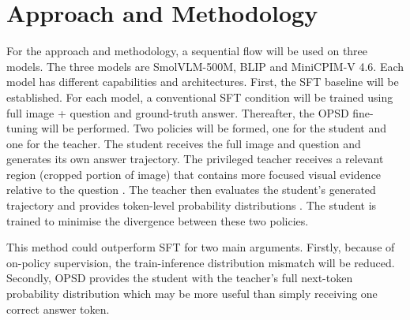 \section{Approach and Methodology}

For the approach and methodology, a sequential flow will be used on three models. The three models are 
SmolVLM-500M, BLIP and MiniCPIM-V 4.6. Each model has different capabilities and architectures.
First, the SFT baseline will be established. For each model, a conventional SFT condition will be trained
using full image + question and ground-truth answer. Thereafter, the OPSD fine-tuning will be performed. 
Two policies will be formed, one for the student and one for the teacher. The student receives the full image
and question and generates its own answer trajectory. The privileged teacher receives a relevant region (cropped portion of image) 
that contains more focused visual evidence relative to the question \parencite{yuan2026vision}.
The teacher then evaluates the student's generated trajectory and provides token-level probability distributions
\parencite{zhao2601self}. The student is trained to minimise the divergence between these two policies. 

This method could outperform SFT for two main arguments. Firstly, because of on-policy supervision, the train-inference
distribution mismatch will be reduced. Secondly, OPSD provides the student with the teacher's full 
next-token probability distribution which may be more useful than simply receiving one correct answer token.

